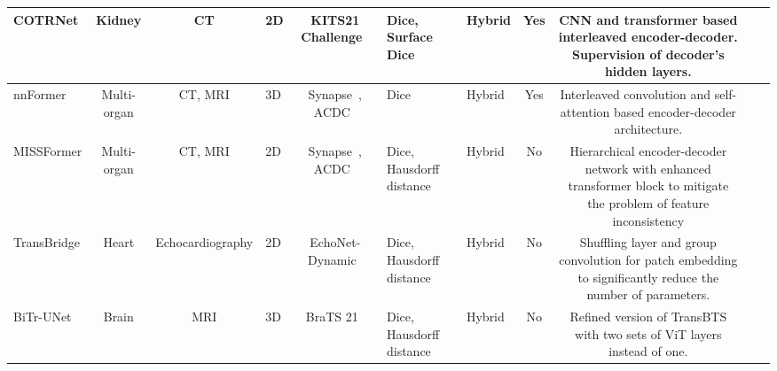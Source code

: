 \begin{table}[]
{\begin{adjustbox}{max width=1.2\textwidth}
\begin{tabular}{V{3}c|c|p{2.2cm}|c|p{3.5cm}|p{3cm}|c|c|p{11.5cm}V{3}}
COTRNet\cite{shen2021automated}         & Kidney         & CT                       & 2D            & KITS21 Challenge~\cite{kits2021}                                                                   & Dice, Surface Dice                                           & Hybrid                & Yes  & CNN and transformer based interleaved encoder-decoder. Supervision of decoder's hidden layers.                                                                                                          \\ \hline
nnFormer\cite{zhou2021nnformer}        & Multi-organ    & CT, MRI                  & 3D            & Synapse~\cite{synapse}, ACDC~\cite{bernard2018deep}                                                                       & Dice                                                         & Hybrid                & Yes  & Interleaved convolution and self-attention based encoder-decoder architecture.                                                                                                                          \\ \hline
MISSFormer\cite{huang2021missformer}      & Multi-organ    & CT, MRI                  & 2D            & Synapse~\cite{synapse}, ACDC~\cite{bernard2018deep}                                                                       & Dice, Hausdorff distance                                     & Hybrid                & No   & Hierarchical encoder-decoder network with enhanced transformer block to mitigate the problem of feature inconsistency                                                                                  \\ \hline
TransBridge\cite{deng2021transbridge}     & Heart          & Echocardiography        & 2D            & EchoNet-Dynamic~\cite{ouyang2020video}                                                                     & Dice, Hausdorff distance                                     & Hybrid                & No   & Shuffling layer and group convolution for patch embedding to significantly reduce the number of parameters.                                                                                            \\ \hline
BiTr-UNet\cite{jia2021bitr}       & Brain          & MRI                      & 3D            & BraTS 21~\cite{baid2021rsna}                                                                         & Dice, Hausdorff distance                                     & Hybrid                & No   & Refined version of TransBTS with two sets of ViT layers instead of one.                                                                                                                                \\ \hline

\end{tabular}
\end{adjustbox}}
\end{table}
